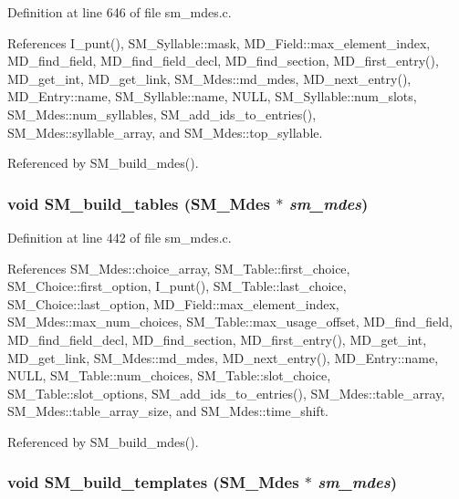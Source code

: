 Definition at line 646 of file sm\_\-mdes.c.

References I\_\-punt(), SM\_\-Syllable::mask, MD\_\-Field::max\_\-element\_\-index, MD\_\-find\_\-field, MD\_\-find\_\-field\_\-decl, MD\_\-find\_\-section, MD\_\-first\_\-entry(), MD\_\-get\_\-int, MD\_\-get\_\-link, SM\_\-Mdes::md\_\-mdes, MD\_\-next\_\-entry(), MD\_\-Entry::name, SM\_\-Syllable::name, NULL, SM\_\-Syllable::num\_\-slots, SM\_\-Mdes::num\_\-syllables, SM\_\-add\_\-ids\_\-to\_\-entries(), SM\_\-Mdes::syllable\_\-array, and SM\_\-Mdes::top\_\-syllable.

Referenced by SM\_\-build\_\-mdes().
\subsubsection{\setlength{\rightskip}{0pt plus 5cm}void SM\_\-build\_\-tables (\bf{SM\_\-Mdes} $\ast$ {\em sm\_\-mdes})}\label{sm__mdes_8c_1dfbd1008eb70627565211e3c1f7a8b3}




Definition at line 442 of file sm\_\-mdes.c.

References SM\_\-Mdes::choice\_\-array, SM\_\-Table::first\_\-choice, SM\_\-Choice::first\_\-option, I\_\-punt(), SM\_\-Table::last\_\-choice, SM\_\-Choice::last\_\-option, MD\_\-Field::max\_\-element\_\-index, SM\_\-Mdes::max\_\-num\_\-choices, SM\_\-Table::max\_\-usage\_\-offset, MD\_\-find\_\-field, MD\_\-find\_\-field\_\-decl, MD\_\-find\_\-section, MD\_\-first\_\-entry(), MD\_\-get\_\-int, MD\_\-get\_\-link, SM\_\-Mdes::md\_\-mdes, MD\_\-next\_\-entry(), MD\_\-Entry::name, NULL, SM\_\-Table::num\_\-choices, SM\_\-Table::slot\_\-choice, SM\_\-Table::slot\_\-options, SM\_\-add\_\-ids\_\-to\_\-entries(), SM\_\-Mdes::table\_\-array, SM\_\-Mdes::table\_\-array\_\-size, and SM\_\-Mdes::time\_\-shift.

Referenced by SM\_\-build\_\-mdes().
\subsubsection{\setlength{\rightskip}{0pt plus 5cm}void SM\_\-build\_\-templates (\bf{SM\_\-Mdes} $\ast$ {\em sm\_\-mdes})}\label{sm__mdes_8c_49fcc91dc04c2f9a7810f62bc097599f}




